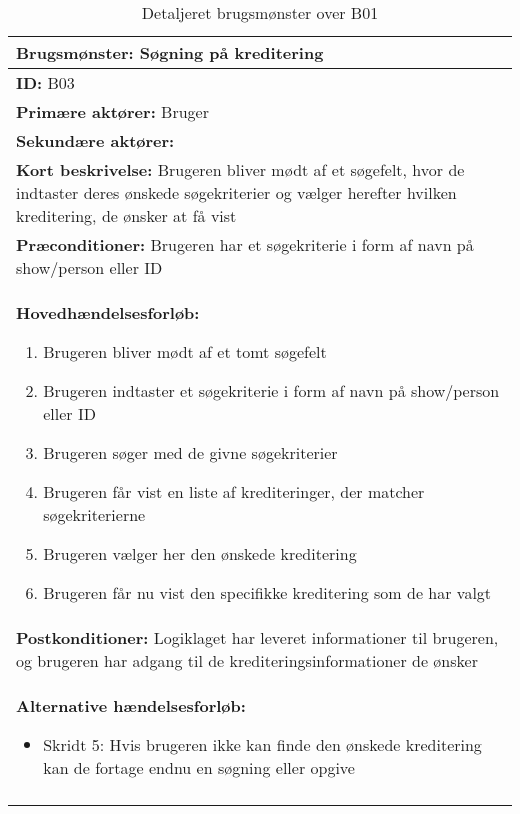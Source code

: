 \begin{longtable}{|p{150mm}|}
\hline
\textbf{Brugsmønster:} Søgning på kreditering\\ \hline
\textbf{ID:} B03         \\ \hline
\textbf{Primære aktører:} Bruger          \\ \hline
\textbf{Sekundære aktører:}        \\ \hline
\textbf{Kort beskrivelse:} Brugeren bliver mødt af et søgefelt, hvor de indtaster deres ønskede søgekriterier og vælger herefter hvilken kreditering, de ønsker at få vist         \\ \hline
\textbf{Præconditioner:} Brugeren har et søgekriterie i form af navn på show/person eller ID        \\ \hline
\textbf{Hovedhændelsesforløb:}
    \begin{enumerate}
    \setlength{\itemsep}{0pt}
        \item Brugeren bliver mødt af et tomt søgefelt
        \item Brugeren indtaster et søgekriterie i form af navn på show/person eller ID
        \item Brugeren søger med de givne søgekriterier
        \item Brugeren får vist en liste af krediteringer, der matcher søgekriterierne
        \item Brugeren vælger her den ønskede kreditering 
        \item Brugeren får nu vist den specifikke kreditering som de har valgt
    \end{enumerate}
\\ \hline
\textbf{Postkonditioner:} Logiklaget har leveret informationer til brugeren, og brugeren har adgang til de krediteringsinformationer de ønsker         \\ \hline
\textbf{Alternative hændelsesforløb:}
\begin{itemize}
    \item Skridt 5: Hvis brugeren ikke kan finde den ønskede kreditering kan de fortage endnu en søgning eller opgive
\end{itemize}\\ \hline
    \caption{Detaljeret brugsmønster over B01}
    \label{tab:Detaljeret_brugsmønsterdiagram_B01}

\end{longtable}


